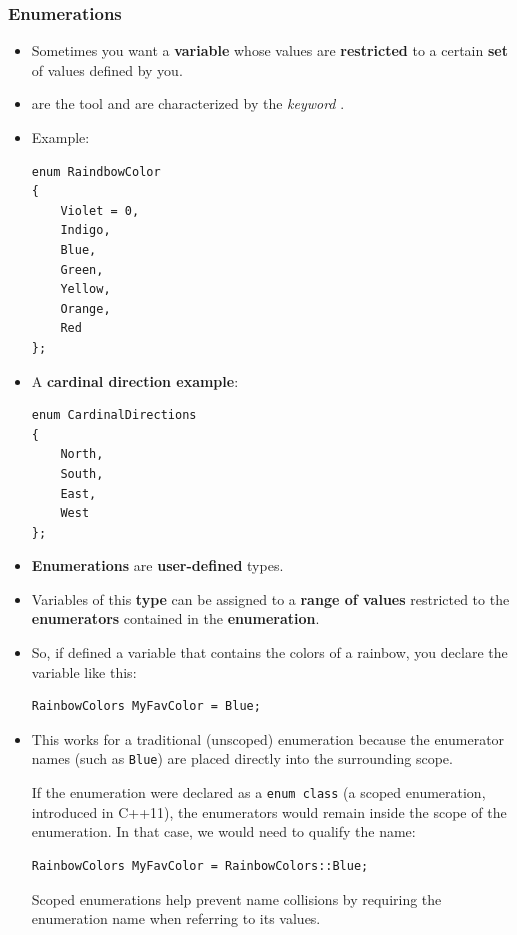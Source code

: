 \documentclass[10pt]{article}
\newcommand{\vocab}[1]{\fbox{\textbf{\textit{#1}}}}
\begin{document}
\subsubsection{Enumerations}
\begin{itemize}
	\item Sometimes you want a \textbf{variable} whose values are \textbf{restricted} to a certain \textbf{set} of values defined by you.
	\item \vocab{Enumerations} are the tool and are characterized by the \textit{keyword} \vocab{enum}.

	\item Example:

	\begin{verbatim}
enum RaindbowColor
{
	Violet = 0,
	Indigo,
	Blue,
	Green,
	Yellow,
	Orange,
	Red
};
	\end{verbatim}
\item A \textbf{cardinal direction example}:
\begin{verbatim}
enum CardinalDirections
{
	North,
	South,
	East,
	West
};
\end{verbatim}

\item \textbf{Enumerations} are \textbf{user-defined} types.
\item Variables of this \textbf{type} can be assigned to a \textbf{range of values} restricted to the \textbf{enumerators} contained in the \textbf{enumeration}.
\item So, if defined a variable that contains the colors of a rainbow, you declare the variable like this:
	\begin{verbatim}
RainbowColors MyFavColor = Blue;
	\end{verbatim}

\item This works for a traditional (unscoped) enumeration because the enumerator names (such as \verb|Blue|) are placed directly into the surrounding scope.

If the enumeration were declared as a \verb|enum class| (a scoped enumeration, introduced in C++11), the enumerators would remain inside the scope of the enumeration. In that case, we would need to qualify the name:

\begin{verbatim}
RainbowColors MyFavColor = RainbowColors::Blue;
\end{verbatim}

Scoped enumerations help prevent name collisions by requiring the enumeration name when referring to its values.\\ 


\end{itemize}
\end{document}
